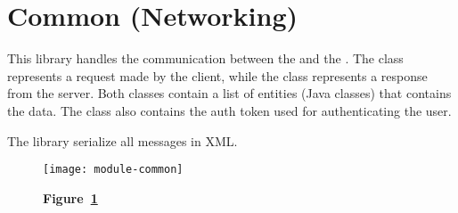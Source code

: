\section{Common (Networking)}\label{sec:common}

This library handles the communication between the  and the
. The  class represents a request made by the
client, while the  class represents a response from the
server. Both classes contain a list of entities (Java classes) that contains the
data. The  class also contains the auth token used for
authenticating the user.

The library serialize all messages in XML\@.

\begin{landscape}
	\begin{figure}[!ht]
		\texttt{[image: module-common]}
		\caption*{\textbf{Figure~\ref{fig:common}}}
		\captionlistentry{}\label{fig:common}
	\end{figure}
\end{landscape}
